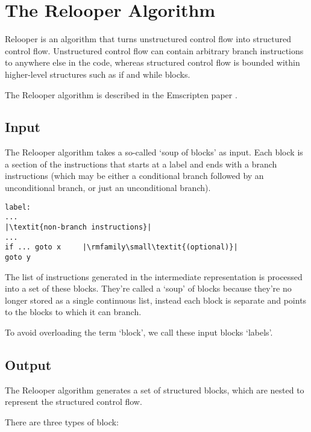 \documentclass[10pt, a4paper]{article}
\begin{document}
\section{The Relooper Algorithm}

Relooper is an algorithm that turns unstructured control flow into structured control flow.
Unstructured control flow can contain arbitrary branch instructions to anywhere else in the code, whereas structured control flow is bounded within higher-level structures such as if and while blocks.

The Relooper algorithm is described in the Emscripten paper \cite{emscripten}.

\subsection{Input}

The Relooper algorithm takes a so-called `soup of blocks' as input.
Each block is a section of the instructions that starts at a label and ends with a branch instructions (which may be either a conditional branch followed by an unconditional branch, or just an unconditional branch).

\begin{minipage}{0.3\textwidth}
\begin{lstlisting}[style=code, frame=single, escapechar=|]
label:
...
|\textit{non-branch instructions}|
...
if ... goto x     |\rmfamily\small\textit{(optional)}|
goto y
\end{lstlisting}
\end{minipage}

The list of instructions generated in the intermediate representation is processed into a set of these blocks.
They're called a `soup' of blocks because they're no longer stored as a single continuous list, instead each block is separate and points to the blocks to which it can branch.

To avoid overloading the term `block', we call these input blocks `labels'.


\subsection{Output}

The Relooper algorithm generates a set of structured blocks, which are nested to represent the structured control flow.

There are three types of block:
\end{document}
